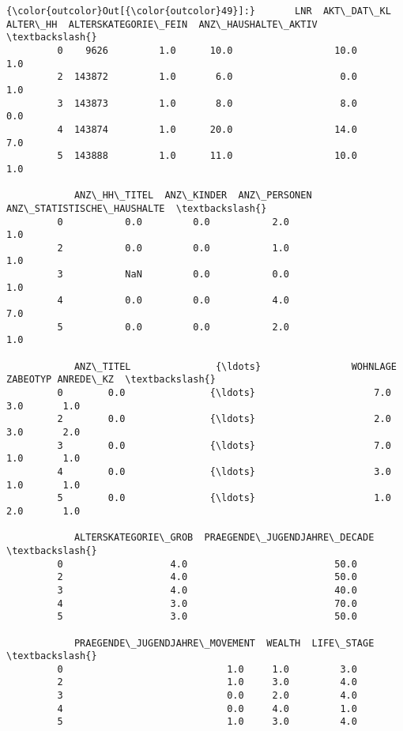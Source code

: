 \documentclass[11pt]{article}
\begin{document}
\begin{Verbatim}[commandchars=\\\{\}]
{\color{outcolor}Out[{\color{outcolor}49}]:}       LNR  AKT\_DAT\_KL  ALTER\_HH  ALTERSKATEGORIE\_FEIN  ANZ\_HAUSHALTE\_AKTIV  \textbackslash{}
         0    9626         1.0      10.0                  10.0                  1.0   
         2  143872         1.0       6.0                   0.0                  1.0   
         3  143873         1.0       8.0                   8.0                  0.0   
         4  143874         1.0      20.0                  14.0                  7.0   
         5  143888         1.0      11.0                  10.0                  1.0   
         
            ANZ\_HH\_TITEL  ANZ\_KINDER  ANZ\_PERSONEN  ANZ\_STATISTISCHE\_HAUSHALTE  \textbackslash{}
         0           0.0         0.0           2.0                         1.0   
         2           0.0         0.0           1.0                         1.0   
         3           NaN         0.0           0.0                         1.0   
         4           0.0         0.0           4.0                         7.0   
         5           0.0         0.0           2.0                         1.0   
         
            ANZ\_TITEL               {\ldots}                WOHNLAGE  ZABEOTYP ANREDE\_KZ  \textbackslash{}
         0        0.0               {\ldots}                     7.0       3.0       1.0   
         2        0.0               {\ldots}                     2.0       3.0       2.0   
         3        0.0               {\ldots}                     7.0       1.0       1.0   
         4        0.0               {\ldots}                     3.0       1.0       1.0   
         5        0.0               {\ldots}                     1.0       2.0       1.0   
         
            ALTERSKATEGORIE\_GROB  PRAEGENDE\_JUGENDJAHRE\_DECADE  \textbackslash{}
         0                   4.0                          50.0   
         2                   4.0                          50.0   
         3                   4.0                          40.0   
         4                   3.0                          70.0   
         5                   3.0                          50.0   
         
            PRAEGENDE\_JUGENDJAHRE\_MOVEMENT  WEALTH  LIFE\_STAGE  \textbackslash{}
         0                             1.0     1.0         3.0   
         2                             1.0     3.0         4.0   
         3                             0.0     2.0         4.0   
         4                             0.0     4.0         1.0   
         5                             1.0     3.0         4.0   
         

\end{Verbatim}
\end{document}
